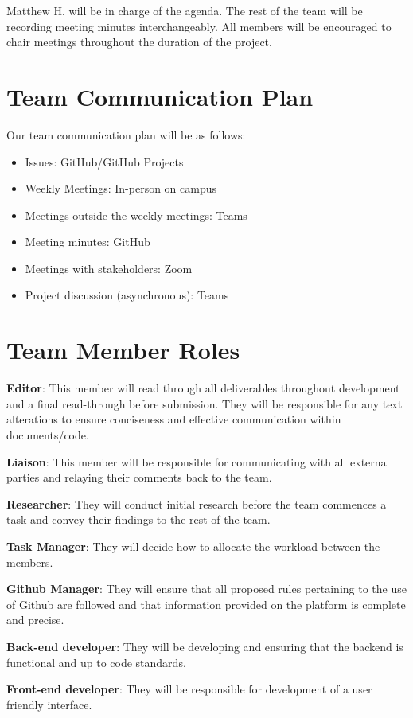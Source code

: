 \documentclass{article}
\begin{document}
Matthew H. will be in charge of the agenda. The rest of the team will be recording meeting minutes interchangeably. All members will be encouraged
to chair meetings throughout the duration of the project. 

\section{Team Communication Plan}

Our team communication plan will be as follows:
\begin{itemize}
  \item Issues: GitHub/GitHub Projects
  \item Weekly Meetings: In-person on campus
  \item Meetings outside the weekly meetings: Teams
  \item Meeting minutes: GitHub
  \item Meetings with stakeholders: Zoom
  \item Project discussion (asynchronous): Teams
\end{itemize}


\section{Team Member Roles}

\textbf{Editor}: This member will read through all deliverables throughout development and a final read-through before submission. They will be responsible for any
text alterations to ensure conciseness and effective communication within documents/code.

\textbf{Liaison}: This member will be responsible for communicating with all external parties and relaying their comments back to the team.

\textbf{Researcher}: They will conduct initial research before the team commences a task and convey their findings to the rest of the team.

\textbf{Task Manager}: They will decide how to allocate the workload between the members.

\textbf{Github Manager}: They will ensure that all proposed rules pertaining to the use of Github are followed and that information provided on the platform is complete and precise.

\textbf{Back-end developer}: They will be developing and ensuring that the backend is functional and up to code standards.

\textbf{Front-end developer}: They will be responsible for development of a user friendly interface.
\end{document}

